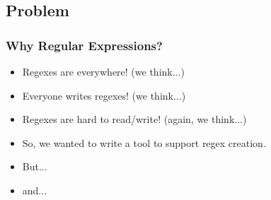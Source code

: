 
\subsection{Problem}
\begin{frame}
\frametitle{Why Regular Expressions?}

\begin{itemize}
\item Regexes are everywhere! (we think...)
\item<2-> Everyone writes regexes! (we think...)
\item<3-> Regexes are hard to read/write! (again, we think...)
\item<4-> So, we wanted to write a tool to support regex creation.
\item<5-> But... 
\end{itemize}



\begin{itemize}
\item<7-> and...
\end{itemize}


\end{frame}

